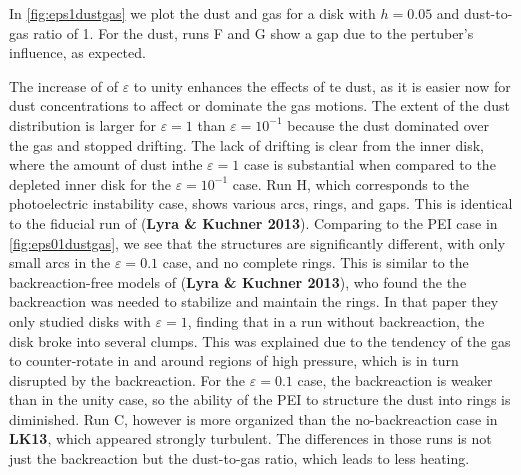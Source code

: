 \documentclass[onecolumn]{report}
\newcommand{\epsi}{\varepsilon}
\begin{document}
In \ref{fig:eps1dustgas} we plot the dust and gas for a disk with $h=0.05$ and dust-to-gas ratio of 1. For the dust, runs F and G show a gap due to the pertuber's influence, as expected.

The increase of of $\epsi$ to unity enhances the effects of te dust, as it is easier now for dust concentrations to affect or dominate the gas motions. The extent of the dust distribution is larger for $\epsi=1$ than $\epsi=10^{-1}$ because the dust dominated over the gas and stopped drifting. The lack of drifting is clear from the inner disk, where the amount of dust inthe $\epsi=1$ case is substantial when compared to the depleted inner disk for the $\epsi=10^{-1}$ case. Run H, which corresponds to the photoelectric instability case, shows various arcs, rings, and gaps. This is identical to the fiducial run of (\textbf{Lyra \& Kuchner 2013}). Comparing to the PEI case in \ref{fig:eps01dustgas}, we see that the structures are significantly different, with only small arcs in the $\epsi=0.1$ case, and no complete rings. This is similar to the backreaction-free models of (\textbf{Lyra \& Kuchner 2013}), who found the the backreaction was needed to stabilize and maintain the rings. In that paper they only studied disks with $\epsi=1$, finding that in a run without backreaction, the disk broke into several clumps. This was explained due to the tendency of the gas to counter-rotate in and around regions of high pressure, which is in turn disrupted by the backreaction. For the $\epsi=0.1$ case, the backreaction is weaker than in the unity case, so the ability of the PEI to structure the dust into rings is diminished. Run C, however is more organized than the no-backreaction case in
\textbf{LK13}, which appeared strongly turbulent. The differences in those runs is not just the backreaction but the dust-to-gas ratio, which leads to less heating.
\end{document}
